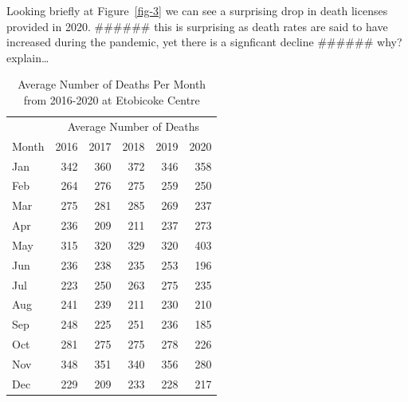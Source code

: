 \documentclass[
  letterpaper,
  DIV=11,
  numbers=noendperiod]{scrartcl}
\begin{document}
Looking briefly at Figure~\ref{fig-3} we can see a surprising drop in
death licenses provided in 2020. \#\#\#\#\#\# this is surprising as
death rates are said to have increased during the pandemic, yet there is
a signficant decline \#\#\#\#\#\# why? explain\ldots{}

\hypertarget{tbl-1}{}
\begin{table}
\caption{\label{tbl-1}Average Number of Deaths Per Month from 2016-2020 at Etobicoke Centre }\tabularnewline

\centering
\begin{tabular}{lrrrrr}
\toprule
\multicolumn{1}{c}{ } & \multicolumn{5}{c}{Average Number of Deaths} \\
\cmidrule(l{3pt}r{3pt}){2-6}
Month & 2016 & 2017 & 2018 & 2019 & 2020\\
\midrule
Jan & 342 & 360 & 372 & 346 & 358\\
Feb & 264 & 276 & 275 & 259 & 250\\
Mar & 275 & 281 & 285 & 269 & 237\\
Apr & 236 & 209 & 211 & 237 & 273\\
May & 315 & 320 & 329 & 320 & 403\\
Jun & 236 & 238 & 235 & 253 & 196\\
Jul & 223 & 250 & 263 & 275 & 235\\
Aug & 241 & 239 & 211 & 230 & 210\\
Sep & 248 & 225 & 251 & 236 & 185\\
Oct & 281 & 275 & 275 & 278 & 226\\
Nov & 348 & 351 & 340 & 356 & 280\\
Dec & 229 & 209 & 233 & 228 & 217\\
\bottomrule
\end{tabular}
\end{table}
\end{document}

